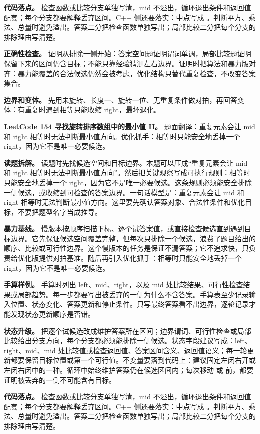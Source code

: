 \textbf{代码落点。} 检查函数或比较分支单独写清，mid 不溢出，循环退出条件和返回值配套；每个分支都要解释丢弃区间。C++ 侧还要落实：中点写成 。判断平方、乘法、总量时避免溢出。答案二分把检查函数单独写出；局部比较二分把每个分支的排除理由写清楚。

\textbf{正确性检查。} 证明从排除一侧开始：答案空间题证明谓词单调，局部比较题证明保留下来的区间仍含目标；不能只靠经验猜测左右边界。证明时把算法和暴力版对齐：暴力能覆盖的合法候选仍然会被考虑，优化结构只替代重复检查，不改变答案集合。

\textbf{边界和变体。} 先用未旋转、长度一、旋转一位、无重复条件做对拍，再回答变体：有重复时遇到相等只能收缩 right，最坏退化。

\noindent\textbf{LeetCode 154 寻找旋转排序数组中的最小值 II。} 题面翻译：重复元素会让 mid 和 right 相等时无法判断最小值方向。优化抓手：相等时只能安全地丢掉一个 right，因为它不是唯一必要候选。

\textbf{读题拆解。} 读题时先找候选空间和目标边界。本题可以压成“重复元素会让 mid 和 right 相等时无法判断最小值方向”。然后把关键观察写成可执行规则：相等时只能安全地丢掉一个 right，因为它不是唯一必要候选。这条规则必须能安全排除一侧候选，或收缩到可检查的答案边界。一句话模型是：重复元素会让 mid 和 right 相等时无法判断最小值方向。这里要先确认答案对象、合法性条件和优化目标，不要把题型名字当成推导。

\textbf{暴力基线。} 慢版本按顺序扫描下标、逐个试答案值，或直接检查候选直到遇到目标边界。它先保证候选空间覆盖完整，但每次只排除一个候选，浪费了题目给出的顺序、比较或可行性边界。这个慢版本的任务是保证不漏答案；它不追求快，只负责给优化版提供对拍基准。随后再引入优化抓手：相等时只能安全地丢掉一个 right，因为它不是唯一必要候选。

\textbf{手算样例。} 手算时列出 left、mid、right，以及 mid 处比较结果、可行性检查结果或局部趋势。每一步都要写出被丢弃的一侧为什么不含答案。手算表至少记录输入位置、状态变化、答案更新和停止条件。只写最终答案看不出边界，逐轮记录才能发现状态更新顺序是否错。

\textbf{状态升级。} 把逐个试候选改成维护答案所在区间；边界谓词、可行性检查或局部比较给出分支方向，每个分支都必须能排除一侧候选。状态字段建议写成：left、right、mid、mid 处比较值或检查返回值、答案区间含义、返回值语义；每一轮更新都要保留目标位置或第一个可行值。不变量要落到代码上：建议固定左闭右开或左闭右闭中的一种。循环中始终维护答案仍在候选区间内；每次移动  或  前，都要证明被丢弃的一侧不可能含有目标。

\textbf{代码落点。} 检查函数或比较分支单独写清，mid 不溢出，循环退出条件和返回值配套；每个分支都要解释丢弃区间。C++ 侧还要落实：中点写成 。判断平方、乘法、总量时避免溢出。答案二分把检查函数单独写出；局部比较二分把每个分支的排除理由写清楚。

